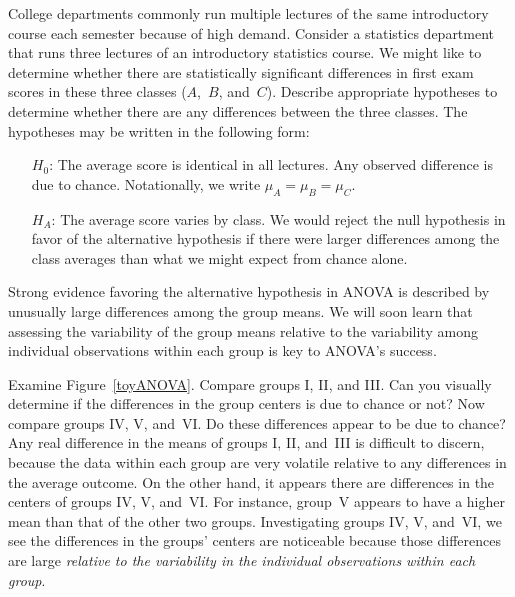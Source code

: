 \begin{examplewrap}
\begin{nexample}{College departments commonly run multiple
    lectures of the same introductory course each semester
    because of high demand.
    Consider a statistics department that runs three lectures
    of an introductory statistics course.
    We might like to determine whether there are statistically
    significant differences in first exam scores in these three
    classes ($A$,~$B$, and~$C$).
    Describe appropriate hypotheses to determine whether
    there are any differences between the three classes.}
  \label{firstExampleForThreeStatisticsClassesAndANOVA}%
  The hypotheses may be written in the following form:
  \begin{itemize}
  \setlength{\itemsep}{0mm}
  \item[$H_0$:]
      The average score is identical in all lectures.
      Any observed difference is due to chance.
      Notationally, we write $\mu_A=\mu_B=\mu_C$.
  \item[$H_A$:]
      The average score varies by class.
      We would reject the null hypothesis in favor of the
      alternative hypothesis if there were larger differences
      among the class averages than what we might expect
      from chance alone.
  \end{itemize}
\end{nexample}
\end{examplewrap}

Strong evidence favoring the alternative hypothesis in ANOVA
is described by unusually large differences among the group means.
We will soon learn that assessing the variability of the group
means relative to the variability among individual observations
within each group is key to ANOVA's success.

\begin{examplewrap}
\begin{nexample}{Examine Figure~\ref{toyANOVA}.
    Compare groups I, II, and III.
    Can you visually determine if the differences in the group
    centers is due to chance or not? Now compare
    groups IV, V, and~VI.
    Do these differences appear to be due to chance?}
  Any real difference in the means of groups I, II, and~III
  is difficult to discern, because the data within each group
  are very volatile relative to any differences in the
  average outcome.
  On the other hand, it appears there are differences
  in the centers of groups IV, V, and~VI.
  For instance, group~V appears to have a higher mean than
  that of the other two groups.
  Investigating groups IV, V, and~VI, we see the differences
  in the groups' centers are noticeable because those
  differences are large \emph{relative to the variability
  in the individual observations within each group}.
\end{nexample}
\end{examplewrap}

